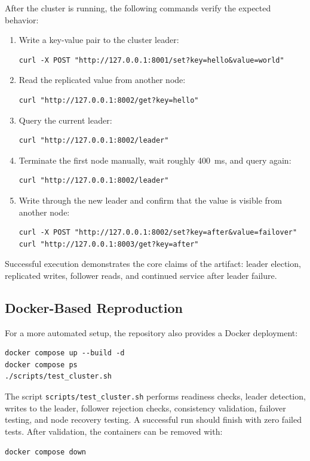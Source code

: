 After the cluster is running, the following commands verify the expected behavior:
\begin{enumerate}
\item Write a key-value pair to the cluster leader:
\begin{verbatim}
curl -X POST "http://127.0.0.1:8001/set?key=hello&value=world"
\end{verbatim}

\item Read the replicated value from another node:
\begin{verbatim}
curl "http://127.0.0.1:8002/get?key=hello"
\end{verbatim}

\item Query the current leader:
\begin{verbatim}
curl "http://127.0.0.1:8002/leader"
\end{verbatim}

\item Terminate the first node manually, wait roughly 400~ms, and query again:
\begin{verbatim}
curl "http://127.0.0.1:8002/leader"
\end{verbatim}

\item Write through the new leader and confirm that the value is visible from another node:
\begin{verbatim}
curl -X POST "http://127.0.0.1:8002/set?key=after&value=failover"
curl "http://127.0.0.1:8003/get?key=after"
\end{verbatim}
\end{enumerate}

Successful execution demonstrates the core claims of the artifact: leader election, replicated writes, follower reads, and continued service after leader failure.

\subsection{Docker-Based Reproduction}

For a more automated setup, the repository also provides a Docker deployment:
\begin{verbatim}
docker compose up --build -d
docker compose ps
./scripts/test_cluster.sh
\end{verbatim}

The script \texttt{scripts/test\_cluster.sh} performs readiness checks, leader detection, writes to the leader, follower rejection checks, consistency validation, failover testing, and node recovery testing. A successful run should finish with zero failed tests. After validation, the containers can be removed with:
\begin{verbatim}
docker compose down
\end{verbatim}

